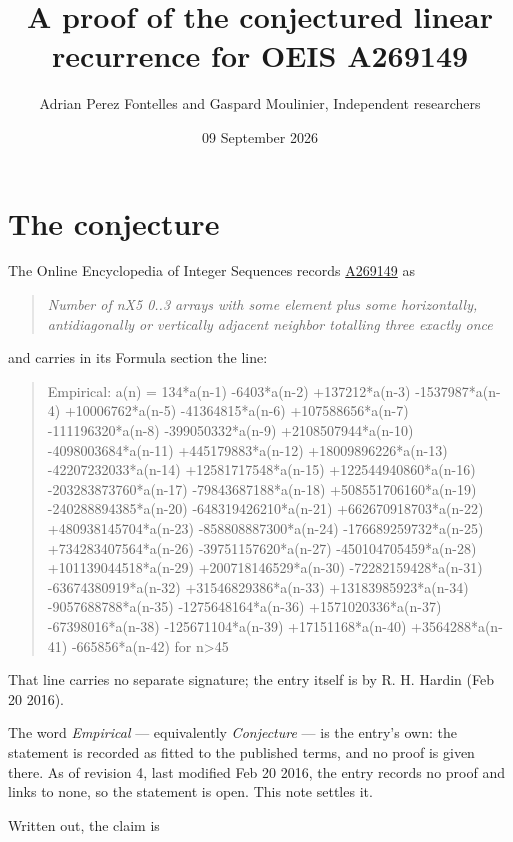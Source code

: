 \documentclass[11pt]{article}
\title{A proof of the conjectured linear recurrence for OEIS A269149}
\author{Adrian Perez Fontelles and Gaspard Moulinier, Independent researchers}
\date{09 September 2026}
\theoremstyle{definition}
\begin{document}
\maketitle
\section{The conjecture}

The Online Encyclopedia of Integer Sequences records \href{https://oeis.org/A269149}{A269149} as

\begin{quote}\itshape Number of nX5 0..3 arrays with some element plus some horizontally, antidiagonally or vertically adjacent neighbor totalling three exactly once\end{quote}

and carries in its Formula section the line:

\begin{quote}\ttfamily Empirical: a(n) = 134*a(n-1) -6403*a(n-2) +137212*a(n-3) -1537987*a(n-4) +10006762*a(n-5) -41364815*a(n-6) +107588656*a(n-7) -111196320*a(n-8) -399050332*a(n-9) +2108507944*a(n-10) -4098003684*a(n-11) +445179883*a(n-12) +18009896226*a(n-13) -42207232033*a(n-14) +12581717548*a(n-15) +122544940860*a(n-16) -203283873760*a(n-17) -79843687188*a(n-18) +508551706160*a(n-19) -240288894385*a(n-20) -648319426210*a(n-21) +662670918703*a(n-22) +480938145704*a(n-23) -858808887300*a(n-24) -176689259732*a(n-25) +734283407564*a(n-26) -39751157620*a(n-27) -450104705459*a(n-28) +101139044518*a(n-29) +200718146529*a(n-30) -72282159428*a(n-31) -63674380919*a(n-32) +31546829386*a(n-33) +13183985923*a(n-34) -9057688788*a(n-35) -1275648164*a(n-36) +1571020336*a(n-37) -67398016*a(n-38) -125671104*a(n-39) +17151168*a(n-40) +3564288*a(n-41) -665856*a(n-42) for n>45\end{quote}

That line carries no separate signature; the entry itself is by R. H. Hardin (Feb 20 2016).

The word {\itshape Empirical} --- equivalently {\itshape Conjecture} --- is the entry's own: the statement is recorded as fitted to the published terms, and no proof is given there. As of revision 4, last modified Feb 20 2016, the entry records no proof and links to none, so the statement is open. This note settles it.

Written out, the claim is
\end{document}
